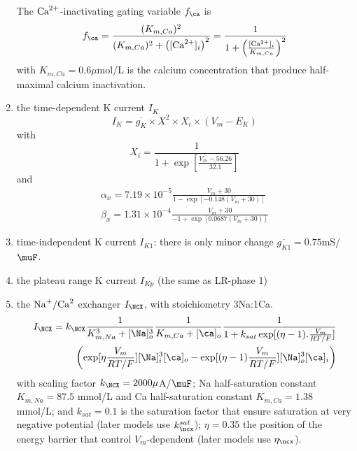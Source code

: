 \begin{enumerate}
The ${\text{Ca}^{2+}}$-inactivating gating variable $f_\ca $ is
\begin{equation}
  \label{eq:385}
  f_\ca  = \frac{(K_{m,Ca})^2}{(K_{m,Ca})^2 +
    \left([\Ca]_i\right)^2} = \frac{1}{1 + \left(\frac{[\Ca]_i}{K_{m,Ca}}\right)^2}
\end{equation}
with $K_{m,Ca}=0.6\mu$mol/L is the calcium concentration that produce
half-maximal calcium inactivation.

\item the time-dependent K current $I_K$
\begin{equation}
  \label{eq:760}
  I_K = \overline{g_{K}} \times X^2 \times X_i\times (V_m-E_K)
\end{equation}
with
\begin{equation}
  \label{eq:766}
  X_i = \frac{1}{1+\exp[\frac{V_m-56.26}{32.1}]}
\end{equation}
and
\begin{equation}
  \label{eq:767}
  \begin{split}
      \alpha_x = 7.19\times 10^{-5}
      \frac{V_m+30}{1-\exp[-0.148(V_m+30)]} \\
      \beta_x = 1.31\times 10^{-4} \frac{V_m+30}{-1+\exp[0.0687(V_m+30)]}
  \end{split}
\end{equation}

\item time-independent K current $I_{K1}$: there is only minor change
  $\overline{g_{K1}}=0.75$mS/$\muF$. 

\item the plateau range K current $I_{Kp}$ (the same as LR-phase 1)

\item the $\ce{Na+}/\ce{Ca^2}$ exchanger $I_\NCX$, with stoichiometry 3Na:1Ca.
\begin{equation}
  \label{eq:770}
  \begin{split}
      I_\NCX = k_\NCX \frac{1}{K^3_{m,Na}+[\Na]_o^3}
      \frac{1}{K_{m,Ca}+[\ca]_o}\frac{1}{1+k_{sat}\exp[(\eta-1).\frac{V_m}{RT/F}]}
      \\
      \left(\exp[\eta\frac{V_m}{RT/F}] [\Na]_i^3 [\ca]_o -
        \exp[(\eta-1)\frac{V_m}{RT/F}] [\Na]_o^3 [\ca]_i\right)
  \end{split}
\end{equation}
with scaling factor $k_\NCX=2000\mu$A/$\muF$; Na half-saturation
constant $K_{m,Na}=87.5$ mmol/L and Ca half-saturation constant
$K_{m,Ca}=1.38$ mmol/L; and $k_{sat}=0.1$ is the saturation factor
that ensure saturation at very negative potential (later models use
$k^{sat}_\ncx$); $\eta=0.35$ the position of the energy barrier that
control $V_m$-dependent (later models use $\eta_\ncx$).


\end{enumerate}

